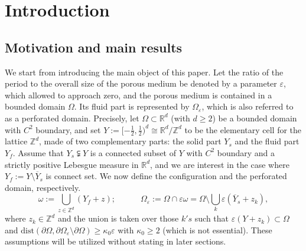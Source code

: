 \documentclass[13pt,CJK]{article}
\theoremstyle{plain}                       %
\theoremstyle{remark}
\numberwithin{equation}{section}
\begin{document}
\tableofcontents


\section{Introduction}

\subsection{\centering Motivation and main results}
\noindent


We start from introducing the main object of this paper.
Let the ratio of the period to
the overall size of the porous medium be denoted by a parameter $\varepsilon$, which allowed to approach zero, and the porous medium is contained in a bounded domain $\Omega$.
Its fluid part is represented by $\Omega_\varepsilon$,
which is also referred to as a perforated domain. Precisely,
let $\Omega\subset \mathbb{R}^d$ (with $d\geq 2$) be a bounded domain
with $C^{2}$ boundary, and set $Y:=[-\frac{1}{2},\frac{1}{2})^d\cong\mathbb{R}^d/\mathbb{Z}^d$ to be the elementary cell for the lattice $\mathbb{Z}^d$, made of two complementary parts:
the solid part $Y_{s}$ and
the fluid part $Y_{f}$.
Assume that $Y_{s}\subsetneqq Y$ is a connected subset of $Y$ with
$C^{2}$ boundary and a strictly positive Lebesgue
measure in $\mathbb{R}^d$, and we are interest in the case
where $Y_f:=Y\setminus \overline{Y}_s$ is connect set.
We now define the configuration and the perforated domain, respectively.
\begin{equation}\label{RA}
\omega:=\bigcup_{z\in\mathbb{Z}^d}(Y_{f}+z);
\qquad\quad
  \Omega_{\varepsilon} := \Omega\cap \varepsilon\omega =
  \Omega\setminus\bigcup_{k}\varepsilon(\overline{Y}_{s}+z_{k}),
\end{equation}
where $z_k\in \mathbb{Z}^d$ and the union is taken over those $k's$ such that
$\varepsilon(Y+z_k)\subset\Omega$ and
$\text{dist}(\partial\Omega,\partial\Omega_{\varepsilon}
\setminus\partial\Omega)\geq \kappa_0\varepsilon$ with
$\kappa_{0}\geq 2$ (which is not essential). These assumptions
will be utilized without stating in later sections.
\end{document}
